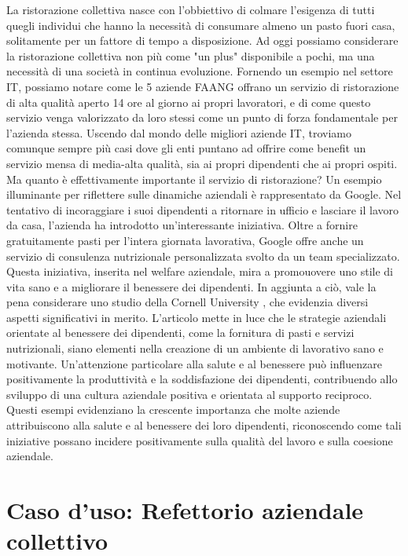 \documentclass[a4paper, titlepage, 12pt, openright, twoside]{book}
\begin{document}
La ristorazione collettiva nasce con l'obbiettivo di colmare l'esigenza di tutti quegli individui
che hanno la necessità di consumare almeno un pasto fuori casa, solitamente per un fattore di tempo a disposizione.
Ad oggi possiamo considerare la ristorazione collettiva non più come "un plus" disponibile a pochi, ma una necessità di una società in continua evoluzione.
Fornendo un esempio nel settore IT, possiamo notare come le 5 aziende FAANG offrano un servizio di ristorazione di alta qualità aperto 14 ore al giorno ai propri lavoratori,
e di come questo servizio venga valorizzato da loro stessi come un punto di forza fondamentale per l'azienda stessa.
\newline
Uscendo dal mondo delle migliori aziende IT, troviamo comunque sempre più casi dove gli enti puntano ad offrire come benefit un servizio mensa di media-alta qualità,
sia ai propri dipendenti che ai propri ospiti.
\newline
Ma quanto è effettivamente importante il servizio di ristorazione?
\newline
Un esempio illuminante per riflettere sulle dinamiche aziendali è rappresentato da Google. Nel tentativo di incoraggiare i suoi dipendenti a ritornare in ufficio e lasciare il lavoro da casa, l'azienda ha introdotto un'interessante iniziativa. Oltre a fornire gratuitamente pasti per l'intera giornata lavorativa, Google offre anche un servizio di consulenza nutrizionale personalizzata svolto da un team specializzato. Questa iniziativa, inserita nel welfare aziendale, mira a promouovere uno stile di vita sano e a migliorare il benessere dei dipendenti.
In aggiunta a ciò, vale la pena considerare uno studio della Cornell University \cite{cornell}, che evidenzia diversi aspetti significativi in merito. L'articolo mette in luce che le strategie aziendali orientate al benessere dei dipendenti, come la fornitura di pasti e servizi nutrizionali, siano elementi nella creazione di un ambiente di lavorativo sano e motivante. Un'attenzione particolare alla salute e al benessere può influenzare positivamente la produttività e la soddisfazione dei dipendenti, contribuendo allo sviluppo di una cultura aziendale positiva e orientata al supporto reciproco. Questi esempi evidenziano la crescente importanza che molte aziende attribuiscono alla salute e al benessere dei loro dipendenti, riconoscendo come tali iniziative possano incidere positivamente sulla qualità del lavoro e sulla coesione aziendale.

\chapter{Caso d'uso: Refettorio aziendale collettivo}\label{chap:caso}
\end{document}
